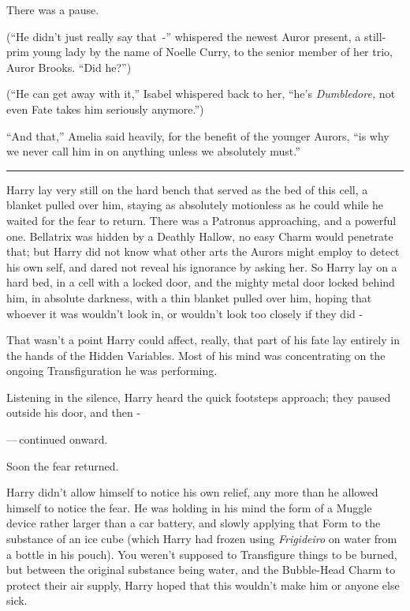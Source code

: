 There was a pause.

(``He didn't just really say that~-'' whispered the newest Auror present, a still-prim young lady by the name of Noelle Curry, to the senior member of her trio, Auror Brooks. ``Did he?'')

(``He can get away with it,'' Isabel whispered back to her, ``he's \emph{Dumbledore,} not even Fate takes him seriously anymore.'')

``And that,'' Amelia said heavily, for the benefit of the younger Aurors, ``is why we never call him in on anything unless we absolutely must.''

\begin{center}\rule{3in}{0.4pt}\end{center}

Harry lay very still on the hard bench that served as the bed of this cell, a blanket pulled over him, staying as absolutely motionless as he could while he waited for the fear to return. There was a Patronus approaching, and a powerful one. Bellatrix was hidden by a Deathly Hallow, no easy Charm would penetrate that; but Harry did not know what other arts the Aurors might employ to detect his own self, and dared not reveal his ignorance by asking her. So Harry lay on a hard bed, in a cell with a locked door, and the mighty metal door locked behind him, in absolute darkness, with a thin blanket pulled over him, hoping that whoever it was wouldn't look in, or wouldn't look too closely if they did -

That wasn't a point Harry could affect, really, that part of his fate lay entirely in the hands of the Hidden Variables. Most of his mind was concentrating on the ongoing Transfiguration he was performing.

Listening in the silence, Harry heard the quick footsteps approach; they paused outside his door, and then -

---\,continued onward.

Soon the fear returned.

Harry didn't allow himself to notice his own relief, any more than he allowed himself to notice the fear. He was holding in his mind the form of a Muggle device rather larger than a car battery, and slowly applying that Form to the substance of an ice cube (which Harry had frozen using \emph{Frigideiro} on water from a bottle in his pouch). You weren't supposed to Transfigure things to be burned, but between the original substance being water, and the Bubble-Head Charm to protect their air supply, Harry hoped that this wouldn't make him or anyone else sick.


